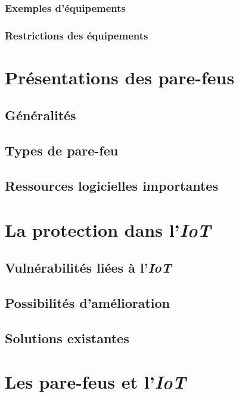 \documentclass[]{article}
\begin{document}
\subsubsection{Exemples d'équipements}

\subsubsection{Restrictions des équipements}

\newpage
\section{Présentations des pare-feus}

\subsection{Généralités}

\subsection{Types de pare-feu}

\subsection{Ressources logicielles importantes}

\newpage
\section{La protection dans l'\textit{IoT}}

\subsection{Vulnérabilités liées à l'\textit{IoT}}

\subsection{Possibilités d'amélioration}

\subsection{Solutions existantes}

\newpage
\section{Les pare-feus et l'\textit{IoT}}
\end{document}

